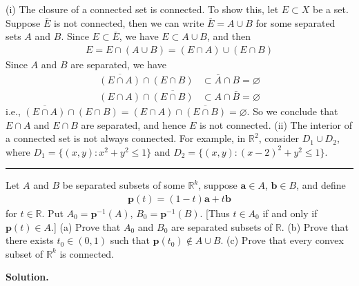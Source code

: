 \documentclass[12pt]{article}
\theoremstyle{definition}
\begin{document}
(i) The closure of a connected set is connected. To show this, let $E\subset X$ be a set. Suppose $\bar{E}$ is not connected, then we can write $\bar{E}=A\cup B$ for some separated sets $A$ and $B$. Since $E\subset\bar{E}$, we have $E\subset A\cup B$, and then
\begin{align*}
E=E\cap(A\cup B)=(E\cap A)\cup(E\cap B)
\end{align*}
Since $A$ and $B$ are separated, we have
\begin{align*}
\overline{(E\cap A)}\cap(E\cap B)&\subset\bar{A}\cap B=\varnothing \\
(E\cap A)\cap\overline{(E\cap B)}&\subset A\cap\bar{B}=\varnothing
\end{align*}
i.e., $\overline{(E\cap A)}\cap(E\cap B)=(E\cap A)\cap\overline{(E\cap B)}=\varnothing$. So we conclude that $E\cap A$ and $E\cap B$ are separated, and hence $E$ is not connected.
(ii) The interior of a connected set is not always connected. For example, in $\mathbb{R}^2$, consider $D_1\cup D_2$, where $D_1=\{(x,y):x^2+y^2\le 1\}$ and $D_2=\{(x,y):(x-2)^2+y^2\le 1\}$.



\bigskip\noindent\hrule\bigskip

Let $A$ and $B$ be separated subsets of some $\mathbb{R}^k$, suppose $\mathbf{a}\in A$, $\mathbf{b}\in B$, and define
\begin{align*}
\mathbf{p}(t)
=(1-t)\mathbf{a}
+t\mathbf{b}
\end{align*}
for $t\in \mathbb{R}$. Put $A_0=\mathbf{p}^{-1}(A)$, $B_0=\mathbf{p}^{-1}(B)$. [Thus $t\in A_0$ if and only if $\mathbf{p}(t)\in A$.]
(a) Prove that $A_0$ and $B_0$ are separated subsets of $\mathbb{R}$.
(b) Prove that there exists $t_0\in(0,1)$ such that $\mathbf{p}(t_0)\notin A\cup B$.
(c) Prove that  every convex subset of $\mathbb{R}^k$ is connected.

\smallskip
\noindent\textbf{Solution.}\quad
\end{document}
